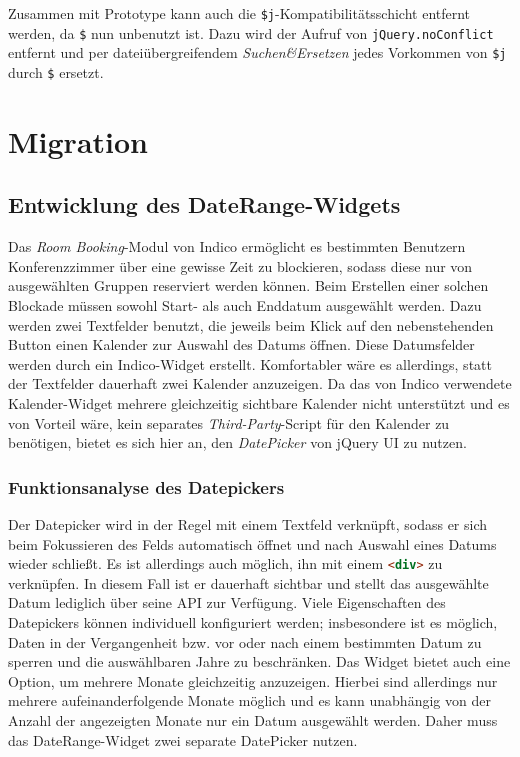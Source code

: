 Zusammen mit Prototype kann auch die \lstinline{$j}-Kompatibilitätsschicht entfernt werden, da
\lstinline{$} nun unbenutzt ist. Dazu wird der Aufruf von \lstinline{jQuery.noConflict} entfernt und
per dateiübergreifendem \emph{Suchen\&Ersetzen} jedes Vorkommen von \lstinline{$j} durch
\lstinline{$} ersetzt.

\section{Migration}

\subsection{Entwicklung des DateRange-Widgets}

Das \emph{Room Booking}-Modul von Indico ermöglicht es bestimmten Benutzern Konferenzzimmer über
eine gewisse Zeit zu blockieren, sodass diese nur von ausgewählten Gruppen reserviert werden können.
Beim Erstellen einer solchen Blockade müssen sowohl Start- als auch Enddatum ausgewählt werden.
Dazu werden zwei Textfelder benutzt, die jeweils beim Klick auf den nebenstehenden Button einen
Kalender zur Auswahl des Datums öffnen. Diese Datumsfelder werden durch ein Indico-Widget erstellt.
Komfortabler wäre es allerdings, statt der Textfelder dauerhaft zwei Kalender anzuzeigen. Da das von
Indico verwendete Kalender-Widget mehrere gleichzeitig sichtbare Kalender nicht unterstützt und es
von Vorteil wäre, kein separates \emph{Third-Party}-Script für den Kalender zu benötigen, bietet es
sich hier an, den \emph{DatePicker} von jQuery UI zu nutzen.

\subsubsection{Funktionsanalyse des Datepickers}

Der Datepicker wird in der Regel mit einem Textfeld verknüpft, sodass er sich beim Fokussieren des
Felds automatisch öffnet und nach Auswahl eines Datums wieder schließt. Es ist allerdings auch
möglich, ihn mit einem \lstinline[language=HTML]{<div>} zu verknüpfen. In diesem Fall ist er
dauerhaft sichtbar und stellt das ausgewählte Datum lediglich über seine API zur Verfügung. Viele
Eigenschaften des Datepickers können individuell konfiguriert werden; insbesondere ist es möglich,
Daten in der Vergangenheit bzw. vor oder nach einem bestimmten Datum zu sperren und die
auswählbaren Jahre zu beschränken. Das Widget bietet auch eine Option, um mehrere Monate
gleichzeitig anzuzeigen. Hierbei sind allerdings nur mehrere aufeinanderfolgende Monate möglich und
es kann unabhängig von der Anzahl der angezeigten Monate nur ein Datum ausgewählt werden. Daher muss
das DateRange-Widget zwei separate DatePicker nutzen.

